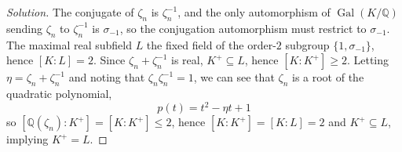 \documentclass[10pt]{article}
\providecommand{\Gal}{\operatorname{Gal}}
\providecommand{\QQ}{\mathbb Q}
\providecommand{\inv}{^{-1}}
\newenvironment{soln}{\begin{proof}[Solution]}{\end{proof}}
\begin{document}
\begin{soln}
    The conjugate of $\zeta_n$ is $\zeta_n\inv$,
    and the only automorphism of $\Gal(K/\QQ)$ sending
    $\zeta_n$ to $\zeta_n\inv$ is $\sigma_{-1}$,
    so the conjugation automorphism must restrict to $\sigma_{-1}$.
    The maximal real subfield $L$ the fixed field
    of the order-$2$ subgroup $\{1,\sigma_{-1}\}$, hence $[K:L] = 2$.
    Since $\zeta_n + \zeta_n\inv$ is real, $K^+\subseteq L$,
    hence $[K:K^+]\ge 2$. Letting $\eta = \zeta_n + \zeta_n\inv$
    and noting that $\zeta_n\zeta_n\inv = 1$,
    we can see that $\zeta_n$ is a root of the quadratic polynomial,
    \begin{equation*}
        p(t) = t^2 - \eta t + 1
    \end{equation*}
    so $[\QQ(\zeta_n):K^+] = [K:K^+]\le 2$,
    hence $[K:K^+] = [K:L] = 2$ and $K^+\subseteq L$,
    implying $K^+ = L$.
\end{soln}
\end{document}
